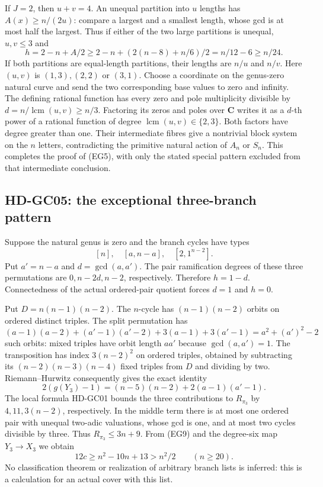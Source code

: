If $J=2$, then $u+v=4$. An unequal partition into $u$ lengths
has $A(x)\geq n/(2u)$: compare a largest and a smallest length,
whose gcd is at most half the largest. Thus if either of the two
large partitions is unequal, $u,v\leq3$ and
\[
       h=2-n+A/2\geq2-n+(2(n-8)+n/6)/2
                         =n/12-6\geq n/24.
\]
If both partitions are equal-length partitions, their lengths are
$n/u$ and $n/v$. Here $(u,v)$ is $(1,3),(2,2)$ or $(3,1)$.
Choose a coordinate on the genus-zero natural curve and send the
two corresponding base values to zero and infinity. The defining
rational function has every zero and pole multiplicity divisible
by $d=n/\operatorname{lcm}(u,v)\geq n/3$. Factoring its zeros and
poles over $\mathbf C$ writes it as a $d$-th power of a rational
function of degree $\operatorname{lcm}(u,v)\in\{2,3\}$.
Both factors have degree greater than one. Their intermediate
fibres give a nontrivial block system on the $n$ letters,
contradicting the primitive natural action of $A_n$ or $S_n$.
This completes the proof of (EG5), with only the stated special
pattern excluded from that intermediate conclusion.

\subsection*{HD-GC05: the exceptional three-branch pattern}

Suppose the natural genus is zero and the branch cycles have types
\[
                   [n],\quad[a,n-a],\quad[2,1^{n-2}].
\]
Put $a'=n-a$ and $d=\gcd(a,a')$. The pair ramification degrees
of these three permutations are $0,n-2d,n-2$, respectively.
Therefore $h=1-d$. Connectedness of the actual ordered-pair
quotient forces $d=1$ and $h=0$.

Put $D=n(n-1)(n-2)$. The $n$-cycle has $(n-1)(n-2)$ orbits on
ordered distinct triples. The split permutation has
\[
 (a-1)(a-2)+(a'-1)(a'-2)+3(a-1)+3(a'-1)
                         =a^2+(a')^2-2
\]
such orbits: mixed triples have orbit length $aa'$ because
$\gcd(a,a')=1$. The transposition has index $3(n-2)^2$ on
ordered triples, obtained by subtracting its
$(n-2)(n-3)(n-4)$ fixed triples from $D$ and dividing by two.
Riemann--Hurwitz consequently gives the exact identity
\[
 2(g(Y_3)-1)=(n-5)(n-2)+2(a-1)(a'-1).              \tag{EG9}
\]
The local formula HD-GC01 bounds the three contributions to
$R_{\pi_3}$ by $4,11,3(n-2)$, respectively. In the middle term
there is at most one ordered pair with unequal two-adic valuations,
whose gcd is one, and at most two cycles divisible by three.
Thus $R_{\pi_3}\leq3n+9$. From (EG9) and the degree-six map
$Y_3\to X_3$ we obtain
\[
                  12c\geq n^2-10n+13>n^2/2
                         \qquad(n\geq20).          \tag{EG10}
\]
No classification theorem or realization of arbitrary branch lists
is inferred: this is a calculation for an actual cover with this list.


